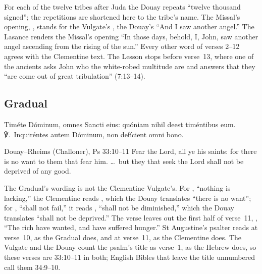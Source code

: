 \noindent For each of the twelve tribes after Juda the Douay repeats ``twelve
thousand signed''; the repetitions are shortened here to the tribe's name. The
Missal's opening, , stands for the Vulgate's , the
Douay's ``And I saw another angel.'' The Lasance renders the Missal's opening
``In those days, behold, I, John, saw another angel ascending from the rising
of the sun.'' Every other word of verses 2--12 agrees with the Clementine
text. The Lesson stops
before verse~13, where one of the ancients asks John who the white-robed
multitude are and answers that they ``are come out of great tribulation''
(7:13--14).

\subsection{Gradual}
\label{proper-gradual}


\begin{latinproper}
Timéte Dóminum, omnes Sancti eius: quóniam nihil deest timéntibus eum.
℣.~Inquiréntes autem Dóminum, non defícient omni bono.
\end{latinproper}

\begin{englishwitness}{Douay--Rheims (Challoner), Ps 33:10--11}
Fear the Lord, all ye his saints: for there is no want to them that fear him.
\dots\ but they that seek the Lord shall not be deprived of any good.
\end{englishwitness}

\noindent The Gradual's wording is not the Clementine Vulgate's. For
, ``nothing is lacking,'' the Clementine reads , which the Douay translates ``there is no want''; for , ``shall not fail,'' it reads , ``shall not be
diminished,'' which the Douay translates ``shall not be deprived.'' The verse
leaves out the first half of verse~11, , ``The rich have wanted, and have suffered hunger.'' St
Augustine's psalter reads  at verse~10, as the Gradual does,
and  at verse~11, as the Clementine does. The Vulgate and
the Douay count the psalm's title as verse~1, as the Hebrew does, so these
verses are 33:10--11 in both; English Bibles that leave the title unnumbered
call them 34:9--10.
